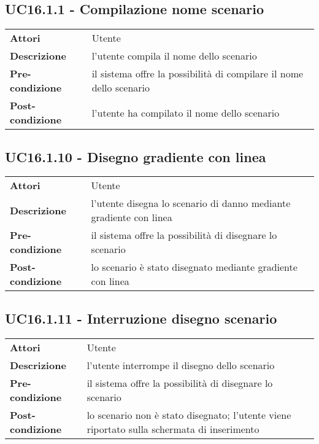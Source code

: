 \subsection{UC16.1.1 - Compilazione nome scenario}
\label{sssec:UC16.1.1}
\def\arraystretch{1.5}
\begin{tabularx}{\textwidth}{l|p{}}
\rowcolor{I} \multicolumn{2}{c}{\color{white}\textbf{UC16.1.1 - Compilazione nome scenario}} \\
\toprule
\endhead
\textbf{Attori} & Utente\\
\textbf{Descrizione} & l'utente compila il nome dello scenario\\
\textbf{Pre-condizione} & il sistema offre la possibilità di compilare il nome dello scenario\\
\textbf{Post-condizione} & l'utente ha compilato il nome dello scenario\\
\bottomrule
\end{tabularx}
\subsection{UC16.1.10 - Disegno gradiente con linea}
\label{sssec:UC16.1.10}
\def\arraystretch{1.5}
\begin{tabularx}{\textwidth}{l|p{}}
\rowcolor{I} \multicolumn{2}{c}{\color{white}\textbf{UC16.1.10 - Disegno gradiente con linea}} \\
\toprule
\endhead
\textbf{Attori} & Utente\\
\textbf{Descrizione} & l'utente disegna lo scenario di danno mediante gradiente con linea\\
\textbf{Pre-condizione} & il sistema offre la possibilità di disegnare lo scenario\\
\textbf{Post-condizione} & lo scenario è stato disegnato mediante gradiente con linea\\
\bottomrule
\end{tabularx}
\subsection{UC16.1.11 - Interruzione disegno scenario}
\label{sssec:UC16.1.11}
\def\arraystretch{1.5}
\begin{tabularx}{\textwidth}{l|p{}}
\rowcolor{I} \multicolumn{2}{c}{\color{white}\textbf{UC16.1.11 - Interruzione disegno scenario}} \\
\toprule
\endhead
\textbf{Attori} & Utente\\
\textbf{Descrizione} & l'utente interrompe il disegno dello scenario\\
\textbf{Pre-condizione} & il sistema offre la possibilità di disegnare lo scenario\\
\textbf{Post-condizione} & lo scenario non è stato disegnato; l'utente viene riportato sulla schermata di inserimento\\
\bottomrule
\end{tabularx}
